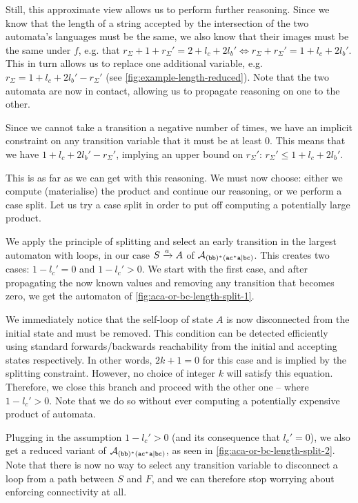 \documentclass[acmsmall,review,anonymous,screen]{acmart}\settopmatter{printfolios=true,printccs=false,printacmref=true}
\theoremstyle{definition}
\begin{document}
Still, this approximate view allows us to perform further reasoning. Since we
know that the length of a string accepted by the intersection of the two
automata's languages must be the same, we also know that their images must be
the same under $f$, e.g. that $r_\Sigma + 1 + r_\Sigma' = 2 + l_c + 2l_b' \iff
r_\Sigma + r_\Sigma' = 1 + l_c + 2l_b'$. This in turn allows us to replace one
additional variable, e.g. $r_\Sigma = 1 + l_c + 2l_b' - r_\Sigma'$ (see
\cref{fig:example-length-reduced}). Note that the two automata are now in
contact, allowing us to propagate reasoning on one to the other.

Since we cannot take a transition a negative number of times, we have an
implicit constraint on any transition variable that it must be at least $0$.
This means that we have $1 + l_c + 2l_b' - r_\Sigma'$, implying an upper bound
on $r_\Sigma'$: $r_\Sigma' \leq 1 + l_c + 2l_b'$.

This is as far as we can get with this reasoning. We must now choose: either we
compute (materialise) the product and continue our reasoning, or we perform a
case split. Let us try a case split in order to put off computing a potentially
large product.

We apply the principle of splitting and select an early transition in the
largest automaton with loops, in our case $S \xrightarrow{a} A$ of $\mathcal{A}_{\mathtt{(bb)^\ast(ac^\ast{}a|bc)}}$.
This creates two cases: $1-l_c' = 0$ and $1-l_c' > 0$. We start with the first
case, and after propagating the now known values and removing any transition
that becomes zero, we get the automaton of \cref{fig:aca-or-bc-length-split-1}.

We immediately notice that the self-loop of state $A$ is now disconnected from
the initial state and must be removed. This condition can be detected
efficiently using standard forwards/backwards reachability from the initial
and accepting states respectively. In other words, $2k+1 = 0$ for this case
and is implied by the splitting constraint. However, no choice of integer $k$
will satisfy this equation. Therefore, we close this branch and proceed with
the other one -- where $1-l_c' > 0$. Note that we do so without ever computing
a potentially expensive product of automata.
  
Plugging in the assumption $1-l_c' > 0$ (and its consequence that $l_c' = 0$),
we also get a reduced variant of $\mathcal{A}_{\mathtt{(bb)^\ast(ac^\ast{}a|bc)}}$, as seen in
\cref{fig:aca-or-bc-length-split-2}. Note that there is now no way to select any
transition variable to disconnect a loop from a path between $S$ and $F$,
and we can therefore stop worrying about enforcing connectivity at all.
\end{document}
